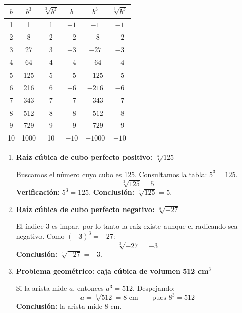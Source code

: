 \documentclass[11pt, letterpaper]{article}
\begin{document}
\begin{tcolorbox}[importantbox, title={Tabla de cubos perfectos — del 1 al 10, positivos y negativos}]
\begin{center}
\renewcommand{\arraystretch}{1.3}
\begin{tabular}{c|c|c||c|c|c}
\toprule
$b$ & $b^3$ & $\sqrt[3]{b^3}$ & $b$ & $b^3$ & $\sqrt[3]{b^3}$\\
\midrule
1  & 1    & 1  & $-1$  & $-1$    & $-1$\\
2  & 8    & 2  & $-2$  & $-8$    & $-2$\\
3  & 27   & 3  & $-3$  & $-27$   & $-3$\\
4  & 64   & 4  & $-4$  & $-64$   & $-4$\\
5  & 125  & 5  & $-5$  & $-125$  & $-5$\\
6  & 216  & 6  & $-6$  & $-216$  & $-6$\\
7  & 343  & 7  & $-7$  & $-343$  & $-7$\\
8  & 512  & 8  & $-8$  & $-512$  & $-8$\\
9  & 729  & 9  & $-9$  & $-729$  & $-9$\\
10 & 1000 & 10 & $-10$ & $-1000$ & $-10$\\
\bottomrule
\end{tabular}
\end{center}
\end{tcolorbox}

\begin{tcolorbox}[examplebox, title={Ejemplos — raíz cúbica}]
\begin{enumerate}[label=\textbf{Ej. \arabic*.}, leftmargin=*, itemsep=14pt]

\item \textbf{Raíz cúbica de cubo perfecto positivo: $\sqrt[3]{125}$}

Buscamos el número cuyo cubo es 125. Consultamos la tabla: $5^3 = 125$.
$$\sqrt[3]{125} = 5$$
\textbf{Verificación:} $5^3 = 125$. \checkmark \quad \textbf{Conclusión:} $\sqrt[3]{125} = 5$.

\item \textbf{Raíz cúbica de cubo perfecto negativo: $\sqrt[3]{-27}$}

El índice 3 es impar, por lo tanto la raíz existe aunque el radicando sea negativo. Como $(-3)^3 = -27$:
$$\sqrt[3]{-27} = -3$$
\textbf{Conclusión:} $\sqrt[3]{-27} = -3$.

\item \textbf{Problema geométrico: caja cúbica de volumen 512 cm$^3$}

Si la arista mide $a$, entonces $a^3 = 512$. Despejando:
$$a = \sqrt[3]{512} = 8 \text{ cm} \qquad\text{pues }8^3 = 512$$
\textbf{Conclusión:} la arista mide $8$ cm.

\end{enumerate}
\end{tcolorbox}
\end{document}
